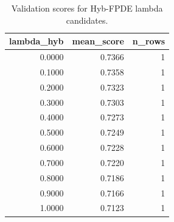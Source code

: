 \begin{table}[t]
\caption{Validation scores for Hyb-FPDE lambda candidates.}
\label{tab:lambda_distribution_computed}
\centering
\begin{tabular}{rrr}
\toprule
lambda\_hyb & mean\_score & n\_rows \\
\midrule
0.0000 & 0.7366 & 1 \\
0.1000 & 0.7358 & 1 \\
0.2000 & 0.7323 & 1 \\
0.3000 & 0.7303 & 1 \\
0.4000 & 0.7273 & 1 \\
0.5000 & 0.7249 & 1 \\
0.6000 & 0.7228 & 1 \\
0.7000 & 0.7220 & 1 \\
0.8000 & 0.7186 & 1 \\
0.9000 & 0.7166 & 1 \\
1.0000 & 0.7123 & 1 \\
\bottomrule
\end{tabular}

\end{table}
